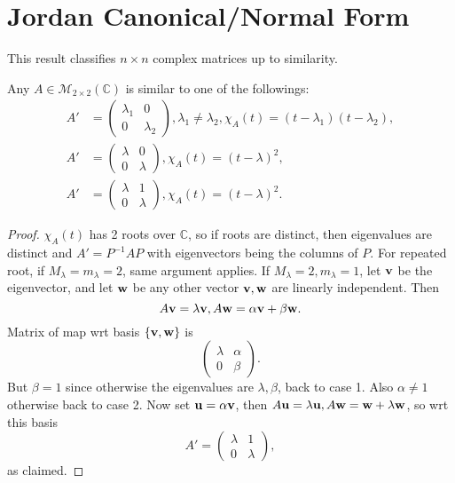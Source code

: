 \documentclass[10pt]{article}
\begin{document}
    \section{Jordan Canonical/Normal Form}
    This result classifies $n\times n$ complex matrices up to similarity.
    \begin{proposition}
        Any $ A\in \mathcal{M}_{2\times 2}(\mathbb{C}) $ is similar to one of the followings:
        \begin{align*}
            A' &= \begin{pmatrix}
                \lambda_1&0\\
                0&\lambda_2
            \end{pmatrix},\lambda_1\neq \lambda_2, \chi_A(t)=(t-\lambda_1)(t-\lambda_2),\\
            A'&= \begin{pmatrix}
                \lambda&0\\
                0&\lambda
            \end{pmatrix},\chi_A(t)=(t-\lambda)^2, \\
            A'&=\begin{pmatrix}
                \lambda&1\\
                0&\lambda
            \end{pmatrix},\chi_A(t)=(t-\lambda)^2.
        \end{align*}
    \end{proposition}
    \begin{proof}
        $ \chi_A(t) $ has 2 roots over $ \mathbb{C} $, so if roots are distinct, then eigenvalues are distinct and $A'=P^{-1}AP$ with eigenvectors being the columns of $P$. For repeated root, if $ M_\lambda=m_\lambda=2 $, same argument applies. If $ M_\lambda=2, m_\lambda=1 $, let ${\bf v}$ be the eigenvector, and let ${\bf w}$ be any other vector $ {\bf v},{\bf w} $ are linearly independent. Then 
        \[
            A{\bf v}=\lambda{\bf v}, A{\bf w} = \alpha{\bf v}+\beta{\bf w}.
        \]
        Matrix of map wrt basis $ \{{\bf v},{\bf w}\} $ is 
        \[
            \begin{pmatrix}
                \lambda&\alpha\\
                0&\beta
            \end{pmatrix}.
        \]
        But $ \beta=1 $ since otherwise the eigenvalues are $ \lambda,\beta $, back to case 1. Also $ \alpha\neq 1 $ otherwise back to case 2. Now set $ {\bf u}=\alpha{\bf v} $, then $ A{\bf u}=\lambda {\bf u}, A{\bf w} = {\bf w}+\lambda{\bf w} $, so wrt this basis 
        \[
            A'=\begin{pmatrix}
                \lambda&1\\
                0&\lambda
            \end{pmatrix},
        \] 
        as claimed.
    \end{proof}
\end{document}
